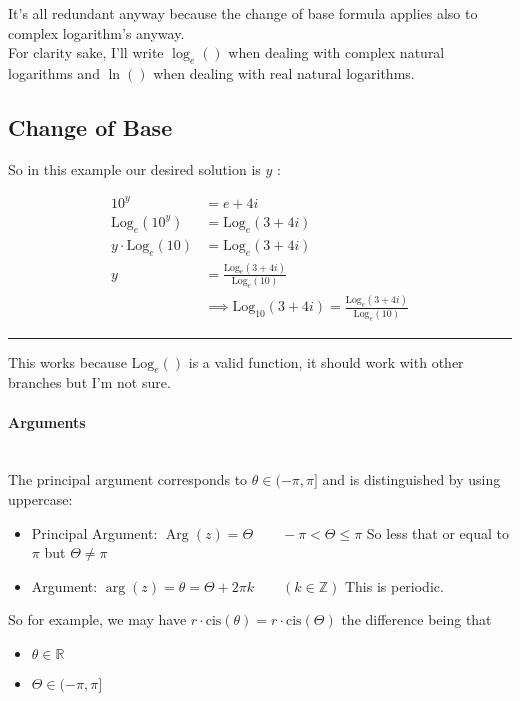 \documentclass[class=article, crop=false]{standalone}
\begin{document}
    It's all redundant anyway because the change of base formula applies also to complex logarithm's anyway.\\

    For clarity sake, I'll write $\log_e{\left(  \right) }$ when dealing with complex natural logarithms and $\ln{\left(  \right) }$ when dealing with real natural logarithms.

    \subsection{Change of Base}
    So in this example our desired solution is $y$ :

    \begin{align*}
      10^y &= e +  4i\\
      \mathrm{Log}_e{\left( 10^y \right) } &=  \mathrm{Log}_e{\left( 3 +  4i \right) } \\
      y \cdot  \mathrm{Log}_e{\left( 10 \right) }&= \mathrm{Log}_e{\left( 3 +  4i \right) }\\
      y &=  \frac{\mathrm{Log}_e{\left( 3 +  4i \right) }}{\mathrm{Log}_e{\left( 10 \right) }} \\
&\implies      \mathrm{Log}_{10}{\left( 3 + 4i \right) } =  \frac{\mathrm{Log}_e{\left( 3 +  4i \right) }}{\mathrm{Log}_e{\left( 10 \right) }}
    \end{align*}
    \begin{flushright}
    {\rule{0.7em}{0.7em}}
    \end{flushright}


    This works because $\mathrm{Log}_e{\left(  \right) }$ is a valid function, it should work with other branches but I'm not sure.


\newpage



\paragraph{Arguments}\ \\
The principal argument corresponds to $\theta \in (-\pi,\pi]$ and is distinguished by using uppercase:
    \begin{itemize}
      \item Principal Argument:
\subitem        $\operatorname{Arg}\left( z \right) = \Theta \qquad -\pi < \Theta \leq \pi$
\subsubitem So less that or equal to $\pi$ but $\Theta \neq \pi$
\item Argument:
  \subitem $\operatorname{arg}\left( z \right) = \theta =  \Theta + 2\pi k  \qquad \left( k \in \mathbb{Z}  \right) $
  \subsubitem This is periodic.
    \end{itemize}
    So for example, we may have $r \cdot \mathrm{cis}{\left( \theta \right) } =  r\cdot \mathrm{cis}{\left( \Theta \right) }$ the difference being that
    \begin{itemize}
      \item $\theta \in \mathbb{R} $
      \item $\Theta \in (-\pi, \pi]$
    \end{itemize}
\end{document}
